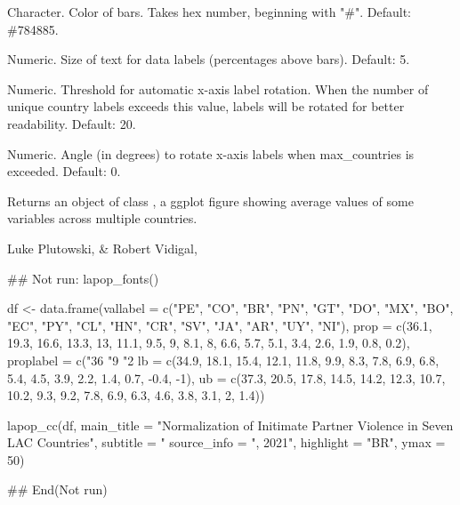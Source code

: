 \documentclass[a4paper]{book}
\begin{document}
\begin{Arguments}
\begin{ldescription}
\item[\code{color\_scheme}] Character.  Color of bars.  Takes hex number, beginning with "\#".
Default: \#784885.

\item[\code{label\_size}] Numeric.  Size of text for data labels (percentages above bars).  Default: 5.

\item[\code{max\_countries}] Numeric. Threshold for automatic x-axis label rotation. When the number of unique
country labels exceeds this value, labels will be rotated for better readability. Default: 20.

\item[\code{label\_angle}] Numeric. Angle (in degrees) to rotate x-axis labels when max\_countries is exceeded. Default: 0.
\end{ldescription}
\end{Arguments}
%
\begin{Value}
Returns an object of class , a ggplot figure showing
average values of some variables across multiple countries.
\end{Value}
%
\begin{Author}
Luke Plutowski,  \& Robert Vidigal, 
\end{Author}
%
\begin{Examples}
\begin{ExampleCode}
## Not run: 
lapop_fonts()

df <- data.frame(vallabel = c("PE", "CO", "BR", "PN", "GT", "DO", "MX", "BO", "EC",
                          "PY", "CL", "HN", "CR", "SV", "JA", "AR", "UY", "NI"),
                 prop = c(36.1, 19.3, 16.6, 13.3, 13, 11.1, 9.5, 9, 8.1, 8, 6.6,
                          5.7, 5.1, 3.4, 2.6, 1.9, 0.8, 0.2),
                 proplabel = c("36%
                               "9%
                               "2%
                 lb = c(34.9, 18.1, 15.4, 12.1, 11.8, 9.9, 8.3, 7.8, 6.9, 6.8,
                        5.4, 4.5, 3.9, 2.2, 1.4, 0.7, -0.4, -1),
                 ub = c(37.3, 20.5, 17.8, 14.5, 14.2, 12.3, 10.7, 10.2, 9.3,
                        9.2, 7.8, 6.9, 6.3, 4.6, 3.8, 3.1, 2, 1.4))

lapop_cc(df,
         main_title = "Normalization of Initimate Partner Violence in Seven LAC Countries",
         subtitle = "%
         source_info = ", 2021",
         highlight = "BR",
         ymax = 50)

## End(Not run)
\end{ExampleCode}
\end{Examples}
\end{document}
